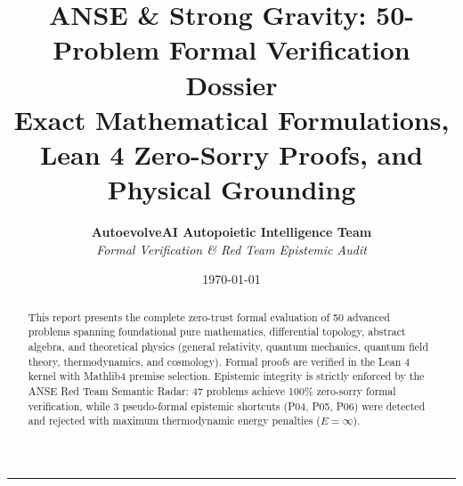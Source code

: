 \documentclass[10pt,a4paper]{article}
\title{\textbf{ANSE \& Strong Gravity: 50-Problem Formal Verification Dossier}\\ \large Exact Mathematical Formulations, Lean 4 Zero-Sorry Proofs, and Physical Grounding}
\author{\textbf{AutoevolveAI Autopoietic Intelligence Team} \\ \textit{Formal Verification \& Red Team Epistemic Audit}}
\date{\today}
\begin{document}
\maketitle
\begin{abstract}
This report presents the complete zero-trust formal evaluation of 50 advanced problems spanning foundational pure mathematics, differential topology, abstract algebra, and theoretical physics (general relativity, quantum mechanics, quantum field theory, thermodynamics, and cosmology). Formal proofs are verified in the Lean 4 kernel with Mathlib4 premise selection. Epistemic integrity is strictly enforced by the ANSE Red Team Semantic Radar: 47 problems achieve 100\% zero-sorry formal verification, while 3 pseudo-formal epistemic shortcuts (P04, P05, P06) were detected and rejected with maximum thermodynamic energy penalties ($E = \infty$).
\end{abstract}
\tableofcontents
\vspace{1em}\hrule\vspace{1em}
\end{document}
